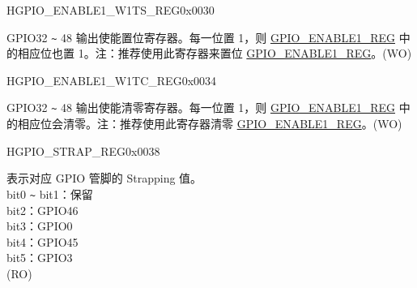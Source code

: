 \begin{register}{H}{GPIO\_ENABLE1\_W1TS\_REG}{0x{}0030}\label{regdesc:GPIOENABLE1W1TSREG}
%
%
\regnewline%
\begin{regdesc}\begin{reglist}
\label{fielddesc:GPIOENABLE1W1TS}\item [GPIO\_ENABLE1\_W1TS] GPIO32 \verb+~+ 48 输出使能置位寄存器。每一位置 1，则 \hyperref[regdesc:GPIOENABLE1REG]{GPIO\_ENABLE1\_REG} 中的相应位也置 1。注：推荐使用此寄存器来置位 \hyperref[regdesc:GPIOENABLE1REG]{GPIO\_ENABLE1\_REG}。(WO)
\end{reglist}\end{regdesc}
\end{register}


\begin{register}{H}{GPIO\_ENABLE1\_W1TC\_REG}{0x{}0034}\label{regdesc:GPIOENABLE1W1TCREG}
%
%
\regnewline%
\begin{regdesc}\begin{reglist}
\label{fielddesc:GPIOENABLE1W1TC}\item [GPIO\_ENABLE1\_W1TC] GPIO32 \verb+~+ 48 输出使能清零寄存器。每一位置 1，则 \hyperref[regdesc:GPIOENABLE1REG]{GPIO\_ENABLE1\_REG} 中的相应位会清零。注：推荐使用此寄存器清零 \hyperref[regdesc:GPIOENABLE1REG]{GPIO\_ENABLE1\_REG}。(WO)
\end{reglist}\end{regdesc}
\end{register}


\begin{register}{H}{GPIO\_STRAP\_REG}{0x{}0038}\label{regdesc:GPIOSTRAPREG}
%
%
\regnewline%
\begin{regdesc}\begin{reglist}
\label{fielddesc:GPIOSTRAPPING}\item [GPIO\_STRAPPING] 表示对应 GPIO 管脚的 Strapping 值。\\
bit0 \verb+~+ bit1：保留\\
bit2：GPIO46\\
bit3：GPIO0\\
bit4：GPIO45\\
bit5：GPIO3\\(RO)
\end{reglist}\end{regdesc}
\end{register}


